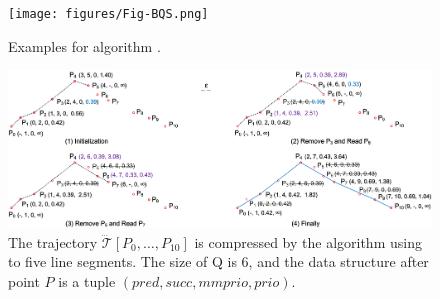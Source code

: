 \begin{figure}[tb!]
\centering
\texttt{[image: figures/Fig-BQS.png]}
\vspace{-2ex}
\caption{{\small Examples for algorithm \bqsa.}}
\label{fig:bqs}
\vspace{-3ex}
\end{figure}


\begin{figure}[tb!]
\centering
\includegraphics[scale=0.66]{figures/Fig-Squishe.png}
\vspace{-1ex}
\caption{\small The trajectory $\dddot{\mathcal{T}}[P_0, \ldots, P_{10}]$ is compressed by the \squishe algorithm using \sed to five line segments. The size of Q is 6, and the data structure after point $P$ is a tuple $(pred, succ, mmprio, prio)$. }
\vspace{-2ex}
\label{fig:squishe}
\end{figure}

